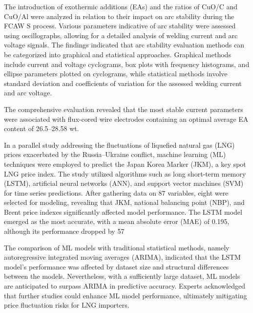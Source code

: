 \documentclass[runningheads]{llncs}
\begin{document}
The introduction of exothermic additions (EAs) and the ratios of CuO/C and CuO/Al were analyzed in relation to their impact on arc stability during the FCAW S process. Various parameters indicative of arc stability were assessed using oscillographs, allowing for a detailed analysis of welding current and arc voltage signals. The findings indicated that arc stability evaluation methods can be categorized into graphical and statistical approaches. Graphical methods include current and voltage cyclograms, box plots with frequency histograms, and ellipse parameters plotted on cyclograms, while statistical methods involve standard deviation and coefficients of variation for the assessed welding current and arc voltage.

The comprehensive evaluation revealed that the most stable current parameters were associated with flux-cored wire electrodes containing an optimal average EA content of 26.5–28.58 wt.%

In a parallel study addressing the fluctuations of liquefied natural gas (LNG) prices exacerbated by the Russia–Ukraine conflict, machine learning (ML) techniques were employed to predict the Japan Korea Marker (JKM), a key spot LNG price index. The study utilized algorithms such as long short-term memory (LSTM), artificial neural networks (ANN), and support vector machines (SVM) for time series predictions. After gathering data on 87 variables, eight were selected for modeling, revealing that JKM, national balancing point (NBP), and Brent price indexes significantly affected model performance. The LSTM model emerged as the most accurate, with a mean absolute error (MAE) of 0.195, although its performance dropped by 57%

The comparison of ML models with traditional statistical methods, namely autoregressive integrated moving averages (ARIMA), indicated that the LSTM model's performance was affected by dataset size and structural differences between the models. Nevertheless, with a sufficiently large dataset, ML models are anticipated to surpass ARIMA in predictive accuracy. Experts acknowledged that further studies could enhance ML model performance, ultimately mitigating price fluctuation risks for LNG importers.
\end{document}
